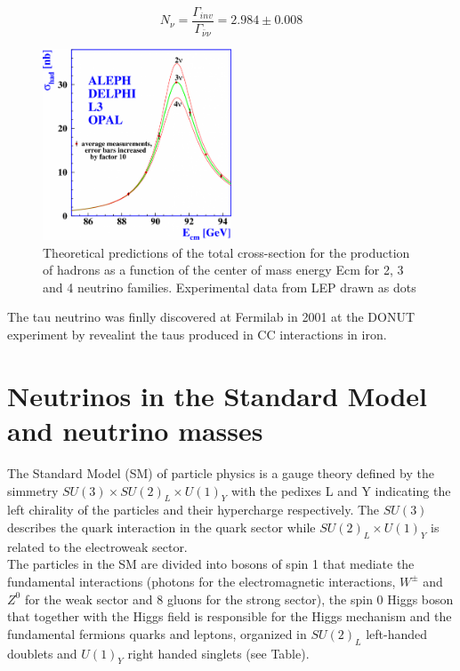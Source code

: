 \documentclass[12pt,a4paper,openright,twoside]{report}
\begin{document}
\begin{equation}
N_\nu=\frac{\Gamma_{inv}}{\Gamma_{\bar{\nu}\nu}} = 2.984\pm 0.008
\end{equation}
\begin{figure}
	\centering
	\label{LEPnu-fig}
	\includegraphics[width=0.5\textwidth]{LEP-NuFlavours.png}
	\caption{Theoretical predictions of the total cross-section for
		the production of hadrons as a function of the center of mass energy Ecm  for 2, 3 and 4 neutrino families. Experimental data from LEP drawn as dots}
\end{figure}
The tau neutrino was finlly discovered at Fermilab in 2001 at the DONUT experiment by revealint the taus produced in CC interactions in iron.
\section{Neutrinos in the Standard Model and neutrino masses}
The Standard Model (SM) of particle physics is a gauge theory defined by the simmetry $SU(3)\times SU(2)_L \times U(1)_Y$ with the pedixes L and Y indicating the left chirality of the particles and their hypercharge respectively. The $SU(3)$ describes the quark interaction in the quark sector while $SU(2)_L \times U(1)_Y$ is related to the electroweak sector. \\
The particles in the SM are divided into bosons of spin 1 that mediate the fundamental interactions (photons for the electromagnetic interactions, $W^ \pm$ and $Z^0$ for the weak sector and 8 gluons for the strong sector), the spin 0 Higgs boson that together with the Higgs field is responsible for the Higgs mechanism and the fundamental fermions quarks and leptons, organized in $SU(2)_L$ left-handed doublets and $U(1)_Y$ right handed singlets (see Table).
\end{document}
